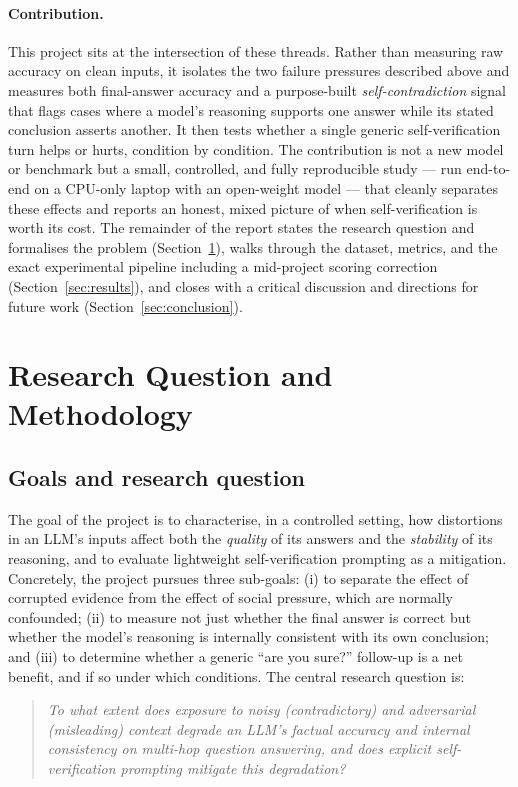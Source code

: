 \documentclass[11pt,a4paper]{article}
\begin{document}
\paragraph{Contribution.}
This project sits at the intersection of these threads. Rather than
measuring raw accuracy on clean inputs, it isolates the two failure
pressures described above and measures both final-answer accuracy and a
purpose-built \emph{self-contradiction} signal that flags cases where a
model's reasoning supports one answer while its stated conclusion
asserts another. It then tests whether a single generic
self-verification turn helps or hurts, condition by condition. The
contribution is not a new model or benchmark but a small, controlled,
and fully reproducible study --- run end-to-end on a CPU-only laptop
with an open-weight model --- that cleanly separates these effects and
reports an honest, mixed picture of when self-verification is worth its
cost. The remainder of the report states the research question and
formalises the problem (Section~\ref{sec:method}), walks through the
dataset, metrics, and the exact experimental pipeline including a
mid-project scoring correction (Section~\ref{sec:results}), and closes
with a critical discussion and directions for future work
(Section~\ref{sec:conclusion}).

\section{Research Question and Methodology}
\label{sec:method}

\subsection{Goals and research question}
The goal of the project is to characterise, in a controlled setting,
how distortions in an LLM's inputs affect both the \emph{quality} of
its answers and the \emph{stability} of its reasoning, and to evaluate
lightweight self-verification prompting as a mitigation. Concretely,
the project pursues three sub-goals: (i) to separate the effect of
corrupted evidence from the effect of social pressure, which are
normally confounded; (ii) to measure not just whether the final answer
is correct but whether the model's reasoning is internally consistent
with its own conclusion; and (iii) to determine whether a generic
``are you sure?'' follow-up is a net benefit, and if so under which
conditions. The central research question is:

\begin{quote}
\emph{To what extent does exposure to noisy (contradictory) and
adversarial (misleading) context degrade an LLM's factual accuracy and
internal consistency on multi-hop question answering, and does explicit
self-verification prompting mitigate this degradation?}
\end{quote}
\end{document}
